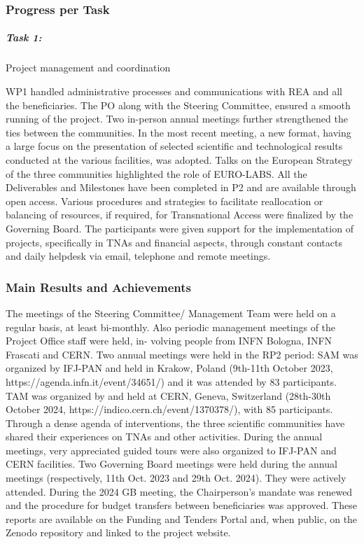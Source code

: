\subsubsection*{Progress per Task}

\subparagraph{Task 1:} Project management and coordination \mbox{}

WP1 handled administrative processes and communications with REA and all the beneficiaries.  The PO along with the Steering Committee, ensured a smooth running of the project. Two in-person annual meetings further strengthened the ties between the communities. In the most recent meeting, a new format, having  a large focus on the presentation of selected scientific and technological results conducted  at the various facilities, was adopted. Talks on  the European Strategy of the three communities highlighted the role of EURO-LABS. All the Deliverables and Milestones have been completed in P2 and are available through open access. Various procedures and strategies to facilitate reallocation or balancing of resources, if required, for Transnational Access were finalized by the Governing Board.
The participants were given support for the  implementation of projects, specifically in TNAs and financial aspects, through constant contacts and daily helpdesk via email, telephone and remote
meetings.

\subsubsection*{Main Results and Achievements}
The meetings of the Steering Committee/ Management Team were held on a regular basis, at least bi-monthly. Also periodic management meetings of the Project Office staff were held, in-
volving people from INFN Bologna, INFN Frascati and CERN. Two annual meetings were held in the RP2 period: SAM was organized by IFJ-PAN and held in Krakow, Poland (9th-11th October 2023,
https://agenda.infn.it/event/34651/) and it was attended by 83 participants. TAM was organized by and
held at CERN, Geneva, Switzerland (28th-30th October 2024, https://indico.cern.ch/event/1370378/), with
85 participants. Through a dense agenda of interventions, the three scientific communities have
shared their experiences on TNAs and other activities. During the annual meetings, very appreciated guided tours were also organized to IFJ-PAN and CERN facilities. Two Governing Board
meetings were held during the annual meetings (respectively, 11th Oct. 2023 and 29th Oct. 2024).
They were actively attended. During the 2024 GB meeting, the Chairperson’s mandate was renewed
and the procedure for budget transfers between beneficiaries was approved. These
reports are available on the Funding and Tenders Portal and, when public, on the Zenodo repository
and linked to the project website.


